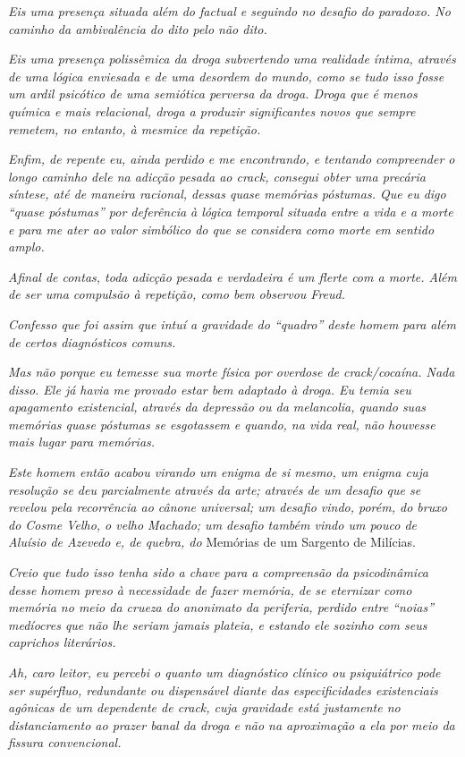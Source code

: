\emph{Eis uma presença situada além do factual e seguindo no desafio do
paradoxo. No caminho da ambivalência do dito pelo não dito.}~

\emph{Eis uma presença polissêmica da droga subvertendo uma realidade
íntima, através de uma lógica enviesada e de uma desordem do mundo, como
se tudo isso fosse um ardil psicótico de uma semiótica perversa da
droga. Droga que é menos química e mais relacional, droga a produzir
significantes novos que sempre remetem, no entanto, à mesmice da
repetição.}~

\emph{Enfim, de repente eu, ainda perdido e me encontrando, e tentando
compreender o longo caminho dele na adicção pesada ao crack, consegui
obter uma precária síntese, até de maneira racional, dessas quase
memórias póstumas. Que eu digo ``quase póstumas'' por deferência à
lógica temporal situada entre a vida e a morte e para me ater ao valor
simbólico do que se considera como morte em sentido amplo.}~

\emph{Afinal de contas, toda adicção pesada e verdadeira é um flerte com
a morte. Além de ser uma compulsão à repetição, como bem observou
Freud.}

\emph{Confesso que foi assim que intuí a gravidade do ``quadro'' deste
homem para além de certos diagnósticos comuns.}~

\emph{Mas não porque eu temesse sua morte física por overdose de
crack/cocaína. Nada disso. Ele já havia me provado estar bem adaptado à
droga. Eu temia seu apagamento existencial, através da depressão ou da
melancolia, quando suas memórias quase póstumas se esgotassem e quando,
na vida real, não houvesse mais lugar para memórias.}~

\emph{Este homem então acabou virando um enigma de si mesmo, um enigma
cuja resolução se deu parcialmente através da arte; através de um
desafio que se revelou pela recorrência ao cânone universal; um desafio
vindo, porém, do bruxo do Cosme Velho, o velho Machado; um desafio
também vindo um pouco de Aluísio de Azevedo e, de quebra, do} Memórias
de um Sargento de Milícias.~

\emph{Creio que tudo isso tenha sido a chave para a compreensão da
psicodinâmica desse homem preso à necessidade de fazer memória, de se
eternizar como memória no meio da crueza do anonimato da periferia,
perdido entre ``noias'' medíocres que não lhe seriam jamais plateia, e
estando ele sozinho com seus caprichos literários.}~

\emph{Ah, caro leitor, eu percebi o quanto um diagnóstico clínico ou
psiquiátrico pode ser supérfluo, redundante ou dispensável diante das
especificidades existenciais agônicas de um dependente de crack, cuja
gravidade está justamente no distanciamento ao prazer banal da droga e
não na aproximação a ela por meio da fissura convencional.}~

